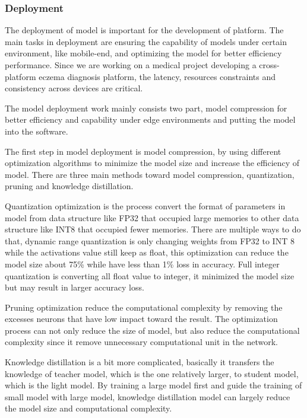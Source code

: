             \subsubsection{Deployment}

            The deployment of model is important for the development of platform. The main tasks in deployment are ensuring the capability of models under certain environment, like mobile-end, and optimizing the model for better efficiency performance. Since we are working on a medical project developing a cross-platform eczema diagnosis platform, the latency, resources constraints and consistency across devices are critical.

                The model deployment work mainly consists two part, model compression for better efficiency and capability under edge environments and putting the model into the software.

                The first step in model deployment is model compression, by using different optimization algorithms to minimize the model size and increase the efficiency of model. There are three main methods toward model compression, quantization, pruning and knowledge distillation.

                Quantization optimization is the process convert the format of parameters in model from data structure like FP32 that occupied large memories to other data structure like INT8 that occupied fewer memories. There are multiple ways to do that, dynamic range quantization is only changing weights from FP32 to INT 8 while the activations value still keep as float, this optimization can reduce the model size about 75\% while have less than 1\% loss in accuracy.  Full integer quantization is converting all float value to integer, it minimized the model size but may result in larger accuracy loss.
                
                Pruning optimization reduce the computational complexity by removing the excesses neurons that have low impact toward the result. The optimization process can not only reduce the size of model, but also reduce the computational complexity since it remove unnecessary computational unit in the network.

                Knowledge distillation\cite{hinton2015distilling} is a bit more complicated, basically it transfers the knowledge of teacher model, which is the one relatively larger, to student model, which is the light model. By training a large model first and guide the training of small model with large model, knowledge distillation model can largely reduce the model size and computational complexity.

